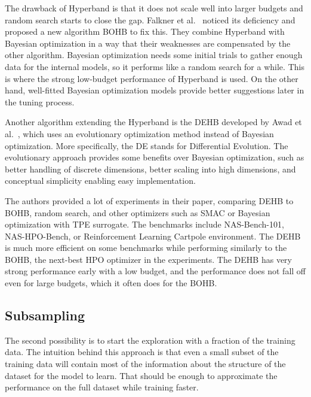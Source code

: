 The drawback of Hyperband is that it does not scale well into larger budgets and random search starts to close the gap. Falkner et al.~\cite{falkner2018bohb} noticed its deficiency and proposed a new algorithm BOHB to fix this. They combine Hyperband with Bayesian optimization in a way that their weaknesses are compensated by the other algorithm. Bayesian optimization needs some initial trials to gather enough data for the internal models, so it performs like a random search for a while. This is where the strong low-budget performance of Hyperband is used. On the other hand, well-fitted Bayesian optimization models provide better suggestions later in the tuning process.

Another algorithm extending the Hyperband is the DEHB developed by Awad et al.~\cite{awad2021dehb}, which uses an evolutionary optimization method instead of Bayesian optimization. More specifically, the DE stands for Differential Evolution. The evolutionary approach provides some benefits over Bayesian optimization, such as better handling of discrete dimensions, better scaling into high dimensions, and conceptual simplicity enabling easy implementation.


The authors provided a lot of experiments in their paper, comparing DEHB to BOHB, random search, and other optimizers such as SMAC or Bayesian optimization with TPE surrogate. The benchmarks include NAS-Bench-101, NAS-HPO-Bench, or Reinforcement Learning Cartpole environment. The DEHB is much more efficient on some benchmarks while performing similarly to the BOHB, the next-best HPO optimizer in the experiments. The DEHB has very strong performance early with a low budget, and the performance does not fall off even for large budgets, which it often does for the BOHB.


\subsection{Subsampling}
The second possibility is to start the exploration with a fraction of the training data. The intuition behind this approach is that even a small subset of the training data will contain most of the information about the structure of the dataset for the model to learn. That should be enough to approximate the performance on the full dataset while training faster.

